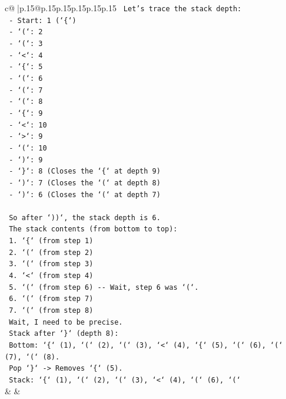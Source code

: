 \documentclass{article}
\begin{document}
{\begin{supertabular}{c@{$\;$}|p{.15\linewidth}@{}p{.15\linewidth}p{.15\linewidth}p{.15\linewidth}p{.15\linewidth}p{.15\linewidth}}
{{{\texttt{      Let's trace the stack depth:} \\
\texttt{      {-} Start: 1 (`\{`)} \\
\texttt{      {-} `(`: 2} \\
\texttt{      {-} `(`: 3} \\
\texttt{      {-} `<`: 4} \\
\texttt{      {-} `\{`: 5} \\
\texttt{      {-} `(`: 6} \\
\texttt{      {-} `(`: 7} \\
\texttt{      {-} `(`: 8} \\
\texttt{      {-} `\{`: 9} \\
\texttt{      {-} `<`: 10} \\
\texttt{      {-} `>`: 9} \\
\texttt{      {-} `(`: 10} \\
\texttt{      {-} `)`: 9} \\
\texttt{      {-} `\}`: 8 (Closes the `\{` at depth 9)} \\
\texttt{      {-} `)`: 7 (Closes the `(` at depth 8)} \\
\texttt{      {-} `)`: 6 (Closes the `(` at depth 7)} \\
\\ 
\texttt{      So after `))`, the stack depth is 6.} \\
\texttt{      The stack contents (from bottom to top):} \\
\texttt{      1. `\{` (from step 1)} \\
\texttt{      2. `(` (from step 2)} \\
\texttt{      3. `(` (from step 3)} \\
\texttt{      4. `<` (from step 4)} \\
\texttt{      5. `(` (from step 6) {-}{-} Wait, step 6 was `(`.} \\
\texttt{      6. `(` (from step 7)} \\
\texttt{      7. `(` (from step 8)} \\
\texttt{      Wait, I need to be precise.} \\
\texttt{      Stack after `\}` (depth 8):} \\
\texttt{      Bottom: `\{` (1), `(` (2), `(` (3), `<` (4), `\{` (5), `(` (6), `(` (7), `(` (8).} \\
\texttt{      Pop `\}` {-}> Removes `\{` (5).} \\
\texttt{      Stack: `\{` (1), `(` (2), `(` (3), `<` (4), `(` (6), `(`} \\
            }
        }
    }
    & & \\ \\


\end{supertabular}}
\end{document}
